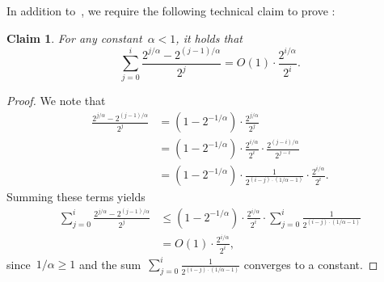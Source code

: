 \documentclass[sigconf]{acmart}
\newtheorem{claim}[theorem]{Claim}
\begin{document}
In addition to~, we require the following technical claim to
prove :
\begin{claim}
    \label{claim:technical}
    For any constant~$\alpha<1$, it holds that 
    $$ \sum_{j=0}^i \frac{2^{j/\alpha} - 2^{(j-1)/\alpha}}{2^{j}} = O(1) \cdot \frac{2^{i/\alpha}}{2^i}. $$
\end{claim}
\begin{proof} 
    We note that
    \begin{align*}
        \frac{2^{j/\alpha} - 2^{(j-1)/\alpha} } {2^j} &= (1-2^{-1/\alpha}) \cdot \frac{2^{j/\alpha} } {2^j} \\
        & = (1-2^{-1/\alpha}) \cdot  \frac{2^{i/\alpha}}{2^i } \cdot \frac{2^{(j-i)/\alpha}}{2^{j-i}} \\
        & =  (1-2^{-1/\alpha}) \cdot \frac{1}{2^{(i-j)\cdot (1/\alpha-1)}} \cdot \frac{2^{i/\alpha}}{2^i }.
    \end{align*}
    Summing these terms yields
    \begin{align*}
        \sum_{j=0}^i \frac{2^{j/\alpha} - 2^{(j-1)/\alpha} } {2^j} & \leq (1-2^{-1/\alpha}) \cdot \frac{2^{i/\alpha}}{2^i} \cdot \sum_{j=0}^i \frac{1}{2^{(i-j)\cdot (1/\alpha-1)}} \\
        &= O(1) \cdot \frac{2^{i/\alpha}}{2^i},
    \end{align*}
    since~$1/\alpha \geq 1$ and the sum~$\sum_{j=0}^i \frac{1}{2^{(i-j) \cdot
    (1/\alpha-1)}}$ converges to a constant.
\end{proof}
\end{document}

